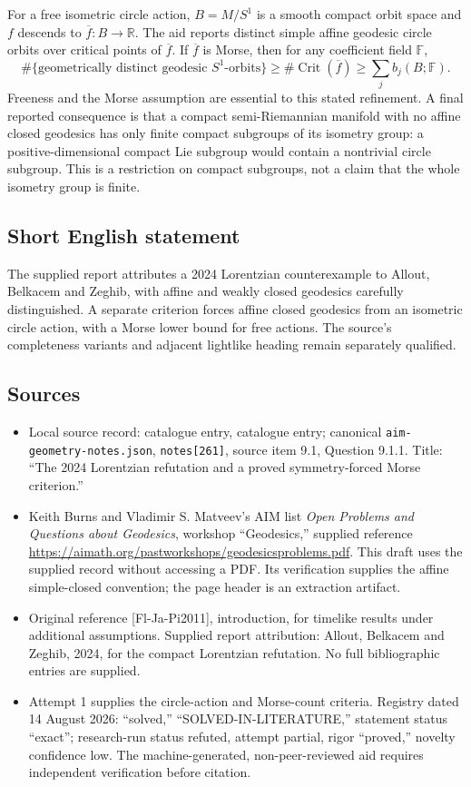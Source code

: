 \documentclass[11pt]{article}
\begin{document}
For a free isometric circle action, \(B=M/S^1\) is a smooth compact orbit space and \(f\) descends to \(\overline f:B\to\mathbb R\). The aid reports distinct simple affine geodesic circle orbits over critical points of \(\overline f\). If \(\overline f\) is Morse, then for any coefficient field \(\mathbb F\),
\[
 \#\{\text{geometrically distinct geodesic }S^1\text{-orbits}\}
 \geq\#\operatorname{Crit}(\overline f)
 \geq\sum_j b_j(B;\mathbb F).
\]
Freeness and the Morse assumption are essential to this stated refinement. A final reported consequence is that a compact semi-Riemannian manifold with no affine closed geodesics has only finite compact subgroups of its isometry group: a positive-dimensional compact Lie subgroup would contain a nontrivial circle subgroup. This is a restriction on compact subgroups, not a claim that the whole isometry group is finite.
\subsection{Short English statement}
The supplied report attributes a 2024 Lorentzian counterexample to Allout, Belkacem and Zeghib, with affine and weakly closed geodesics carefully distinguished. A separate criterion forces affine closed geodesics from an isometric circle action, with a Morse lower bound for free actions. The source's completeness variants and adjacent lightlike heading remain separately qualified.
\subsection{Sources}
\begin{itemize}
\item Local source record: catalogue entry, catalogue entry; canonical \texttt{aim-geometry-notes.json}, \texttt{notes[261]}, source item 9.1, Question 9.1.1. Title: ``The 2024 Lorentzian refutation and a proved symmetry-forced Morse criterion.''
\item Keith Burns and Vladimir S. Matveev's AIM list \emph{Open Problems and Questions about Geodesics}, workshop ``Geodesics,'' supplied reference \url{https://aimath.org/pastworkshops/geodesicsproblems.pdf}. This draft uses the supplied record without accessing a PDF. Its verification supplies the affine simple-closed convention; the page header is an extraction artifact.
\item Original reference [Fl-Ja-Pi2011], introduction, for timelike results under additional assumptions. Supplied report attribution: Allout, Belkacem and Zeghib, 2024, for the compact Lorentzian refutation. No full bibliographic entries are supplied.
\item Attempt 1 supplies the circle-action and Morse-count criteria. Registry dated 14 August 2026: ``solved,'' ``SOLVED-IN-LITERATURE,'' statement status ``exact''; research-run status refuted, attempt partial, rigor ``proved,'' novelty confidence low. The machine-generated, non-peer-reviewed aid requires independent verification before citation.
\end{itemize}
\end{document}
